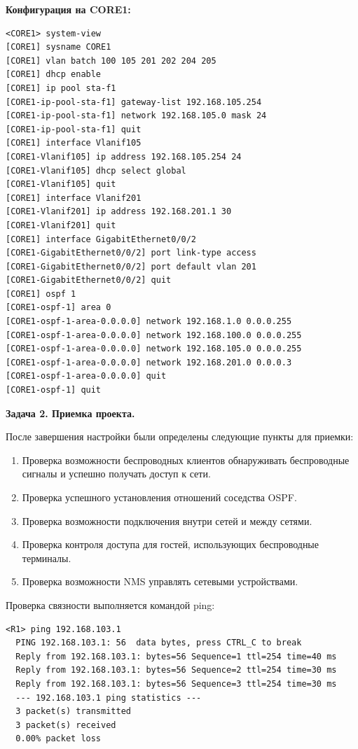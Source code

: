 \textbf{Конфигурация на CORE1:}

\begin{verbatim}
<CORE1> system-view
[CORE1] sysname CORE1
[CORE1] vlan batch 100 105 201 202 204 205
[CORE1] dhcp enable
[CORE1] ip pool sta-f1
[CORE1-ip-pool-sta-f1] gateway-list 192.168.105.254
[CORE1-ip-pool-sta-f1] network 192.168.105.0 mask 24
[CORE1-ip-pool-sta-f1] quit
[CORE1] interface Vlanif105
[CORE1-Vlanif105] ip address 192.168.105.254 24
[CORE1-Vlanif105] dhcp select global
[CORE1-Vlanif105] quit
[CORE1] interface Vlanif201
[CORE1-Vlanif201] ip address 192.168.201.1 30
[CORE1-Vlanif201] quit
[CORE1] interface GigabitEthernet0/0/2
[CORE1-GigabitEthernet0/0/2] port link-type access
[CORE1-GigabitEthernet0/0/2] port default vlan 201
[CORE1-GigabitEthernet0/0/2] quit
[CORE1] ospf 1
[CORE1-ospf-1] area 0
[CORE1-ospf-1-area-0.0.0.0] network 192.168.1.0 0.0.0.255
[CORE1-ospf-1-area-0.0.0.0] network 192.168.100.0 0.0.0.255
[CORE1-ospf-1-area-0.0.0.0] network 192.168.105.0 0.0.0.255
[CORE1-ospf-1-area-0.0.0.0] network 192.168.201.0 0.0.0.3
[CORE1-ospf-1-area-0.0.0.0] quit
[CORE1-ospf-1] quit
\end{verbatim}

\textbf{Задача 2. Приемка проекта.}

После завершения настройки были определены следующие пункты для приемки:

\begin{enumerate}
    \item Проверка возможности беспроводных клиентов обнаруживать беспроводные сигналы и успешно получать доступ к сети.
    \item Проверка успешного установления отношений соседства OSPF.
    \item Проверка возможности подключения внутри сетей и между сетями.
    \item Проверка контроля доступа для гостей, использующих беспроводные терминалы.
    \item Проверка возможности NMS управлять сетевыми устройствами.
\end{enumerate}

Проверка связности выполняется командой ping:

\begin{verbatim}
<R1> ping 192.168.103.1
  PING 192.168.103.1: 56  data bytes, press CTRL_C to break
  Reply from 192.168.103.1: bytes=56 Sequence=1 ttl=254 time=40 ms
  Reply from 192.168.103.1: bytes=56 Sequence=2 ttl=254 time=30 ms
  Reply from 192.168.103.1: bytes=56 Sequence=3 ttl=254 time=30 ms
  --- 192.168.103.1 ping statistics ---
  3 packet(s) transmitted
  3 packet(s) received
  0.00% packet loss
\end{verbatim}

